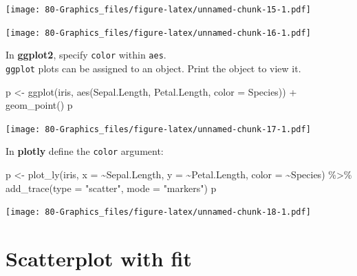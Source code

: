 \documentclass[
]{book}
\newenvironment{Shaded}{\begin{snugshade}}{\end{snugshade}}
\newcommand{\AttributeTok}[1]{\textcolor[rgb]{0.77,0.63,0.00}{#1}}
\newcommand{\FunctionTok}[1]{\textcolor[rgb]{0.00,0.00,0.00}{#1}}
\newcommand{\NormalTok}[1]{#1}
\newcommand{\OtherTok}[1]{\textcolor[rgb]{0.56,0.35,0.01}{#1}}
\newcommand{\SpecialCharTok}[1]{\textcolor[rgb]{0.00,0.00,0.00}{#1}}
\newcommand{\StringTok}[1]{\textcolor[rgb]{0.31,0.60,0.02}{#1}}
\begin{document}
\texttt{[image: 80-Graphics\_files/figure-latex/unnamed-chunk-15-1.pdf]}

\begin{Shaded}
\end{Shaded}

\texttt{[image: 80-Graphics\_files/figure-latex/unnamed-chunk-16-1.pdf]}

In \textbf{ggplot2}, specify \texttt{color} within \texttt{aes}.\\
\texttt{ggplot} plots can be assigned to an object. Print the object to view it.

\begin{Shaded}
\begin{Highlighting}[]
\NormalTok{p }\OtherTok{\textless{}{-}} \FunctionTok{ggplot}\NormalTok{(iris, }\FunctionTok{aes}\NormalTok{(Sepal.Length, Petal.Length, }\AttributeTok{color =}\NormalTok{ Species)) }\SpecialCharTok{+}
  \FunctionTok{geom\_point}\NormalTok{()}
\NormalTok{p}
\end{Highlighting}
\end{Shaded}

\texttt{[image: 80-Graphics\_files/figure-latex/unnamed-chunk-17-1.pdf]}

In \textbf{plotly} define the \texttt{color} argument:

\begin{Shaded}
\begin{Highlighting}[]
\NormalTok{p }\OtherTok{\textless{}{-}} \FunctionTok{plot\_ly}\NormalTok{(iris, }\AttributeTok{x =} \SpecialCharTok{\textasciitilde{}}\NormalTok{Sepal.Length, }\AttributeTok{y =} \SpecialCharTok{\textasciitilde{}}\NormalTok{Petal.Length, }\AttributeTok{color =} \SpecialCharTok{\textasciitilde{}}\NormalTok{Species) }\SpecialCharTok{\%\textgreater{}\%} 
  \FunctionTok{add\_trace}\NormalTok{(}\AttributeTok{type =} \StringTok{"scatter"}\NormalTok{, }\AttributeTok{mode =} \StringTok{"markers"}\NormalTok{)}
\NormalTok{p}
\end{Highlighting}
\end{Shaded}

\texttt{[image: 80-Graphics\_files/figure-latex/unnamed-chunk-18-1.pdf]}

\hypertarget{scatterplot-with-fit}{%
\section{Scatterplot with fit}\label{scatterplot-with-fit}}
\end{document}

